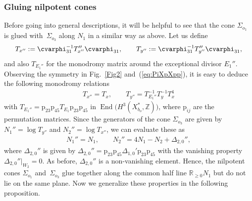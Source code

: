 \documentclass[pdftex]{sigma}
\numberwithin{equation}{section}
\begin{document}
\subsubsection{Gluing nilpotent cones} Before going into general descriptions, it will be helpful to see that the cone $\Sigma_{o_{1}}$ is glued with~$\Sigma_{o_{3}}$ along $N_{1}$ in a similar way as above. Let
us define
\begin{gather*}
T_{x''}:=\cvarphi_{31}^{-1}T_{x''}''\cvarphi_{31},\qquad T_{y''}:=\cvarphi_{31}^{-1}T_{y''}''\cvarphi_{31},
\end{gather*}
and also $T_{E_{1}''}$ for the monodromy matrix around the exceptional divisor $E_{1}''$. Observing the symmetry in Fig.~\ref{Fig2} and~(\ref{eq:PiXpXpp}), it is easy to deduce the following monodromy relations
\begin{gather}
\boxed{T_{x''}=T_{x},\qquad T_{y''}=T_{E_{1}''}^{-1}T_{y}^{-1}T_{x}^{4}}\label{eq:T-relation2}
\end{gather}
with $T_{E_{1}''}=\mathrm{p}_{23}\mathrm{p}_{45}T_{E_{1}}\mathrm{p}_{23}\mathrm{p}_{45}$ in $\operatorname{End}\big(H^{3}(X_{b_{o}}^{*},\mathbb{Z})\big)$, where $\mathrm{p}_{ij}$ are the permutation matrices. Since the generators of the cone $\Sigma_{o_{3}}$ are given by $N_{1}''=\log T_{y''}$ and $N_{2}''=\log T_{x''}$, we can evaluate these as
\begin{gather}
N_{1}''=N_{1},\qquad N_{2}''=4N_{1}-N_{2}+\Delta_{2,0}'',\label{eq:Npp-and-N}
\end{gather}
where $\Delta_{2,0}''$ is given by $\Delta_{2,0}''=\mathrm{p}_{23}\mathrm{p}_{45}\Delta_{1,0}'\mathrm{p}_{23}\mathrm{p}_{45}$ with the vanishing property $\Delta_{2,0}''\vert_{W_{2}}=0$. As before, $\Delta_{2,0}''$ is a non-vanishing element. Hence, the nilpotent cones $\Sigma_{o_{1}}$ and~$\Sigma_{o_{3}}$ glue together along the common half line $\mathbb{R}_{\geq0}N_{1}$ but do not lie on the same plane. Now we generalize these properties in the following proposition.
\end{document}
